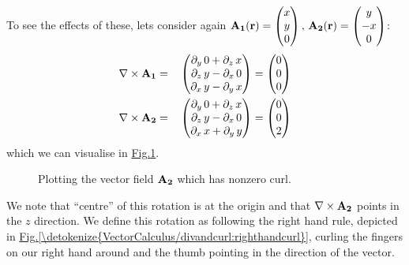 \documentclass[letterpaper,10pt,english]{jupyterBook}
\begin{document}
\sphinxAtStartPar
To see the effects of these, lets consider again \({\bf A_1(r)} = \begin{pmatrix} x \\ y \\ 0\end{pmatrix}, \,{\bf A_2(r)} = \begin{pmatrix} y \\ -x \\ 0\end{pmatrix}\):
\begin{equation*}
\begin{split}\nabla \times {\bf A_1} &=&\, \begin{pmatrix} \partial_y\, 0 + \partial_z\, x \\ \partial_z\, y - \partial_x\, 0 \\ \partial_x\, y - \partial_y\, x  \end{pmatrix} = \begin{pmatrix} 0 \\ 0 \\ 0 \end{pmatrix} \\
\nabla \times {\bf A_2} &=&\, \begin{pmatrix} \partial_y\, 0 + \partial_z\, x \\ \partial_z\, y - \partial_x\, 0 \\ \partial_x\, x + \partial_y\, y  \end{pmatrix} = \begin{pmatrix} 0 \\ 0 \\ 2 \end{pmatrix}\end{split}
\end{equation*}
\sphinxAtStartPar
which we can visualise in \hyperref[\detokenize{VectorCalculus/divandcurl:id1}]{Fig.\@ \ref{\detokenize{VectorCalculus/divandcurl:id1}}}.

\begin{figure}[htbp]
\centering
\capstart

\noindent{}
\caption{Plotting the vector field \({\bf A_2}\) which has non\sphinxhyphen{}zero curl.}\label{\detokenize{VectorCalculus/divandcurl:id1}}\end{figure}

\sphinxAtStartPar
We note that “centre” of this rotation is at the origin and that \(\nabla \times {\bf A_2}\) points in the \(z\) direction.  We define this rotation as following the right
hand rule, depicted in \hyperref[\detokenize{VectorCalculus/divandcurl:righthandcurl}]{Fig.\@ \ref{\detokenize{VectorCalculus/divandcurl:righthandcurl}}}, curling the fingers on our right hand around and the thumb pointing in the direction of the vector.
\end{document}
